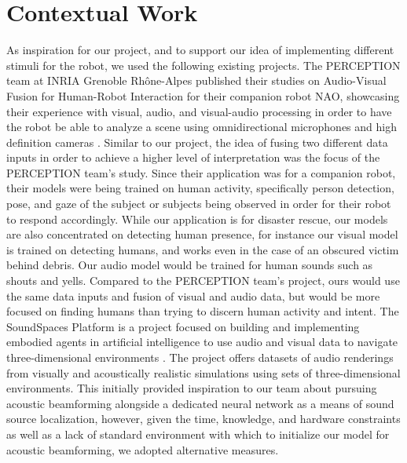 \documentclass{article}
\begin{document}
\section{Contextual Work}
As inspiration for our project, and to support our idea of implementing different stimuli for the robot, we used the following existing projects. The PERCEPTION team at INRIA Grenoble Rhône-Alpes published their studies on Audio-Visual Fusion for Human-Robot Interaction for their companion robot NAO, showcasing their experience with visual, audio, and visual-audio processing in order to have the robot be able to analyze a scene using omnidirectional microphones and high definition cameras \cite{1}. Similar to our project, the idea of fusing two different data inputs in order to achieve a higher level of interpretation was the focus of the PERCEPTION team’s study. Since their application was for a companion robot, their models were being trained on human activity, specifically person detection, pose, and gaze of the subject or subjects being observed in order for their robot to respond accordingly. While our application is for disaster rescue, our models are also concentrated on detecting human presence, for instance our visual model is trained on detecting humans, and works even in the case of an obscured victim behind debris. Our audio model would be trained for human sounds such as shouts and yells. Compared to the PERCEPTION team’s project, ours would use the same data inputs and fusion of visual and audio data, but would be more focused on finding humans than trying to discern human activity and intent. The SoundSpaces Platform is a project focused on building and implementing embodied agents in artificial intelligence to use audio and visual data to navigate three-dimensional environments \cite{2}. The project offers datasets of audio renderings from visually and acoustically realistic simulations using sets of three-dimensional environments. This initially provided inspiration to our team about pursuing acoustic beamforming alongside a dedicated neural network as a means of sound source localization, however, given the time, knowledge, and hardware constraints as well as a lack of standard environment with which to initialize our model for acoustic beamforming, we adopted alternative measures.
\end{document}
